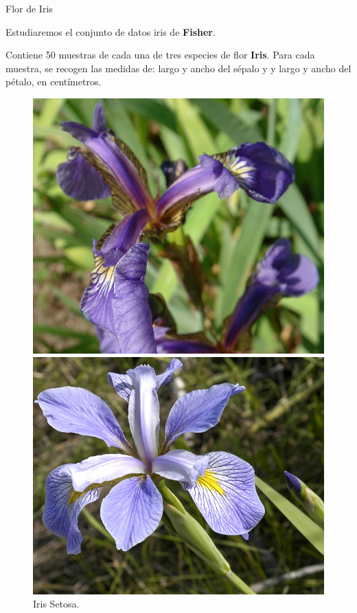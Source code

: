 \documentclass[spanish]{beamer}
\begin{document}
\begin{frame}{Flor de Iris}

Estudiaremos el conjunto de datos iris de \textbf{Fisher}.\break

Contiene 50 muestras de cada una de tres especies de flor \textbf{Iris}. Para cada muestra, se recogen las medidas de: largo y ancho del sépalo y y largo y ancho del pétalo, en centímetros.

\begin{figure}[h]
  \centering
  \begin{minipage}[h]{0.28\textwidth}
    \includegraphics[width=\textwidth]{dani/setosa.jpg}
    \caption{Iris Setosa.}
  \end{minipage}
  \hfill
  \begin{minipage}[h]{0.28\textwidth}
    \includegraphics[width=\textwidth]{dani/virginica.jpg}

\end{minipage}
\end{figure}
\end{frame}
\end{document}

